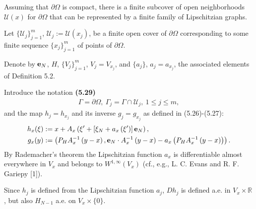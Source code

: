 \documentclass{book}
\numberwithin{equation}{section}
\begin{document}
\begin{enumerate}
\begin{enumerate}
        Assuming that $\partial\Omega$ is compact, there is a finite subcover of open neighborhoods $\mathcal{U}(x)$ for $\partial\Omega$ that can be represented by a finite family of Lipschitzian graphs.
        
        Let $\{\mathcal{U}_j\}_{j=1}^m$, $\mathcal{U}_j := \mathcal{U}(x_j)$, be a finite open cover of $\partial\Omega$ corresponding to some finite sequence $\{x_j\}_{j=1}^m$ of points of $\partial\Omega$.
        
        Denote by ${\bf e}_N$, $H$, $\{V_j\}_{j=1}^m$, $V_j = V_{x_j}$, and $\{a_j\}$, $a_j = a_{x_j}$, the associated elements of Definition 5.2.
        
        Introduce the notation \textbf{(5.29)}
        \begin{align*}
            \Gamma = \partial\Omega,\ \Gamma_j = \Gamma\cap\mathcal{U}_j,\ 1\le j\le m,
        \end{align*}
        and the map $h_j = h_{x_j}$ and its inverse $g_j = g_{x_j}$ as defined in (5.26)-(5.27):
        \begin{align*}
            h_x(\xi) &:= x + A_x\left(\xi' + \left[\xi_N + a_x\left(\xi'\right)\right]{\bf e}_N\right),\\
            g_x(y) &:= \left(P_HA_x^{-1}\left(y - x\right),{\bf e}_N\cdot A_x^{-1}\left(y - x\right) - a_x\left(P_HA_x^{-1}\left(y - x\right)\right)\right).
        \end{align*}
        By Rademacher's theorem the Lipschitzian function $a_x$ is differentiable almost everywhere in $V_x$ and belongs to $W^{1,\infty}(V_x)$ (cf., e.g., L. C. Evans and R. F. Gariepy [1]).
        
        Since $h_j$ is defined from the Lipschitzian function $a_j$, $Dh_j$ is defined a.e. in $V_x\times\mathbb{R}$, but also $H_{N-1}$ a.e. on $V_x\times\{0\}$.
        

\end{enumerate}
\end{enumerate}
\end{document}
